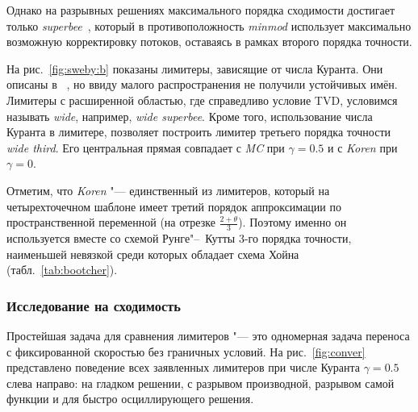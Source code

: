 Однако на разрывных решениях максимального порядка сходимости достигает только \textit{superbee}~\cite{Roe1985},
который в противоположность \textit{minmod} использует максимально возможную корректировку потоков,
оставаясь в рамках второго порядка точности.

На рис.~\ref{fig:sweby:b} показаны лимитеры, зависящие от числа Куранта. Они описаны в ~\cite{Roe1985},
но ввиду малого распространения не получили устойчивых имён.
Лимитеры с расширенной областью, где справедливо условие TVD, условимся называть \textit{wide}, например, \textit{wide superbee}.
Кроме того, использование числа Куранта в лимитере, позволяет построить лимитер третьего порядка точности \textit{wide third}.
Его центральная прямая совпадает с \textit{MC} при \(\gamma=0.5\) и с \textit{Koren} при \(\gamma=0\).

Отметим, что \textit{Koren} "--- единственный из лимитеров, который на четырехточечном шаблоне имеет третий порядок аппроксимации по пространственной переменной
(на отрезке \( \frac{2+\theta}{3} \)). Поэтому именно он используется вместе со схемой Рунге"--~Кутты 3-го порядка точности,
наименьшей невязкой среди которых обладает схема Хойна (табл.~\ref{tab:bootcher}).

\subsubsection{Исследование на сходимость}

Простейшая задача для сравнения лимитеров "--- это одномерная задача переноса с фиксированной скоростью без граничных условий.
На рис.~\ref{fig:conver} представлено поведение всех заявленных лимитеров при числе Куранта \(\gamma=0.5\) слева направо:
на гладком решении, с разрывом производной, разрывом самой функции и для быстро осциллирующего решения.

